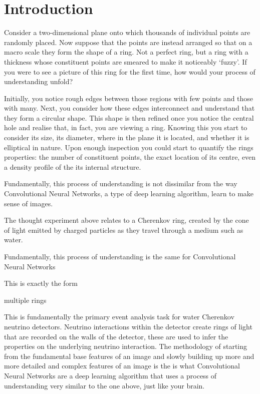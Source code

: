 \chapter{Introduction} %
\label{chap:introduction} %
\setcounter{page}{17}  %

Consider a two-dimensional plane onto which thousands of individual points are randomly placed.
Now suppose that the points are instead arranged so that on a macro scale they form the shape of a
ring. Not a perfect ring, but a ring with a thickness whose constituent points are smeared to make
it noticeably `fuzzy'. If you were to see a picture of this ring for the first time, how would
your process of understanding unfold?

Initially, you notice rough edges between those regions with few points and those with many. Next,
you consider how these edges interconnect and understand that they form a circular shape. This
shape is then refined once you notice the central hole and realise that, in fact, you are viewing
a ring. Knowing this you start to consider its size, its diameter, where in the plane it is
located, and whether it is elliptical in nature. Upon enough inspection you could start to
quantify the rings properties: the number of constituent points, the exact location of its centre,
even a density profile of the its internal structure.

Fundamentally, this process of understanding is not dissimilar from the way Convolutional Neural
Networks, a type of deep learning algorithm, learn to make sense of images. 

The thought experiment above relates to a Cherenkov ring, created by the cone of light emitted by
charged particles as they travel through a medium such as water.

Fundamentally, this process of understanding is the same for Convolutional Neural Networks

This is exactly the form 

multiple rings

This is fundamentally the primary event analysis task for water Cherenkov neutrino detectors.
Neutrino interactions within the detector create rings of light that are recorded on the walls of
the detector, these are used to infer the properties on the underlying neutrino interaction. The
methodology of starting from the fundamental base features of an image and slowly building up more
and more detailed and complex features of an image is the is what Convolutional Neural Networks
are a deep learning algorithm that uses a process of understanding very similar to the one above,
just like your brain. 

